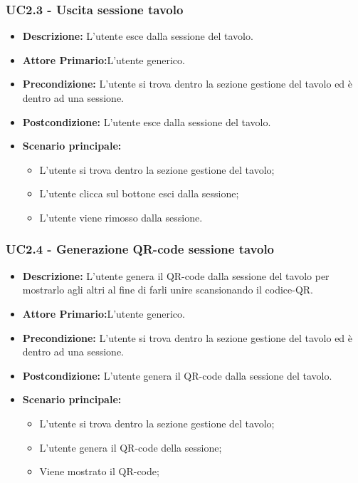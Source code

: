 \subsubsection{UC2.3 - Uscita sessione tavolo}
\begin{itemize}
    \item \textbf{Descrizione:} L'utente esce dalla sessione del tavolo.
    \item \textbf{Attore Primario:}L'utente generico.
    \item \textbf{Precondizione:} L'utente si trova dentro la sezione gestione del tavolo ed è dentro ad una sessione.
    \item \textbf{Postcondizione:} L'utente esce dalla sessione del tavolo.
    \item \textbf{Scenario principale:}
    \begin{itemize}
        \item L'utente si trova dentro la sezione gestione del tavolo;
        \item L'utente clicca sul bottone esci dalla sessione;
        \item L'utente viene rimosso dalla sessione.
    \end{itemize}
\end{itemize}
\subsubsection{UC2.4 - Generazione QR-code sessione tavolo}
\begin{itemize}
    \item \textbf{Descrizione:} L'utente genera il QR-code dalla sessione del tavolo per mostrarlo agli altri al fine di farli unire scansionando il codice-QR.
    \item \textbf{Attore Primario:}L'utente generico.
    \item \textbf{Precondizione:} L'utente si trova dentro la sezione gestione del tavolo ed è dentro ad una sessione.
    \item \textbf{Postcondizione:} L'utente genera il QR-code dalla sessione del tavolo.
    \item \textbf{Scenario principale:}
    \begin{itemize}
        \item L'utente si trova dentro la sezione gestione del tavolo;
        \item L'utente genera il QR-code della sessione;
        \item Viene mostrato il QR-code;
    \end{itemize}
\end{itemize}
